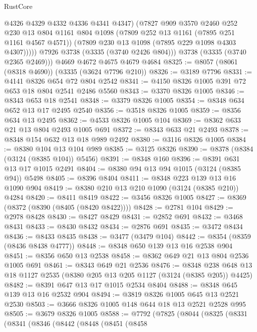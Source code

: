\begin{lexlean}{RustCore}
\begin{coremodule}
              @4326
              @4329
              @4332
              @4336
              @4341
              @4347)
            (@7827
              @909
              @3570
              @2460
              @252
              @230
              @13
              @804
              @1161
              @804
              @1098
              (@7809 @252 @13 @1161 (@7895 @251 @1161 @4567 @4571))
              (@7809 @230 @13 @1098 (@7895 @229 @1098 @4303 @4307)))))
        @7926
        @3738
        (@3335 (@3740 @2426 @804)))
      @3738
      (@3335 (@3740 @2365 @2469)))
    @4669
    @4672
    @4675
    @4679
    @4684
@8325 := @8057 (@8061 (@8318 @4690)) (@3335 (@3624 @7796 @210))
@8326 := @3189 @7796
@8331 := @4141 @8326 @654 @72 @804 @2542
@8341 := @4150 @8326 @1005 @391 @72 @653 @18 @804 @2541 @2486 @5560
@8343 := @3370 @8326 @1005
@8346 := @8343 @653 @18 @2541
@8348 := @3379 @8326 @1005
@8354 := @8348 @634 @652 @13 @17 @2495 @2540
@8356 := @3518 @8326 @1005
@8359 := @8356 @634 @13 @2495
@8362 := @4533 @8326 @1005 @104
@8369 := @8362 @633 @21 @13 @804 @2493 @1005 @691
@8372 := @8343 @633 @21 @2493
@8378 := @8348 @154 @632 @13 @18 @989 @2492
@8380 := @3116 @8326 @1005
@8384 := @8380 @104 @13 @104 @989
@8385 := @3125 @8326
@8390 := @8378 (@8384 (@3124 (@8385 @104)) @5456)
@8391 := @8348 @160
@8396 := @8391 @631 @13 @17 @1015 @2491
@8404 := @8380 @94 @13 @94 @1015 (@3124 (@8385 @94)) @5498
@8405 := @8396 @8404
@8411 := @8348 @223 @139 @13 @16 @1090 @904
@8419 := @8380 @210 @13 @210 @1090 (@3124 (@8385 @210)) @4284
@8420 := @8411 @8419
@8422 := @3456 @8326 @1005
@8427 := @8369 (@8372 (@8390 (@8405 (@8420 @8422))))
@8428 := @2781 @104
@8429 := @2978 @8428
@8430 := @8427 @8429
@8431 := @2852 @691
@8432 := @3468 @8431
@8433 := @8430 @8432
@8434 := @2876 @691
@8435 := @3472 @8434
@8436 := @8433 @8435
@8438 := @3477 (@3479 @104)
@8442 := @8354 (@8359 (@8436 @8438 @4777))
@8448 := @8348 @650 @139 @13 @16 @2538 @904
@8451 := @8356 @650 @13 @2538
@8458 := @8362 @649 @21 @13 @804 @2536 @1005 @691
@8461 := @8343 @649 @21 @2536
@8476 := @8348 @238 @648 @13 @18 @1127 @2535 (@8380 @205 @13 @205 @1127 (@3124 (@8385 @205)) @4425)
@8482 := @8391 @647 @13 @17 @1015 @2534 @8404
@8488 := @8348 @645 @139 @13 @16 @2532 @904
@8494 := @3819 @8326 @1005 @645 @13 @2521 @2530
@8503 := @3666 @8326 @1005 @148 @644 @18 @13 @2521 @2528 @995
@8505 := @3679 @8326 @1005
@8588 := @7792
    (@7825
      (@8044
        (@8325
          (@8331
            (@8341
              (@8346
                (@8442
                  (@8448
                    (@8451
                      (@8458

\end{coremodule}
\end{lexlean}
